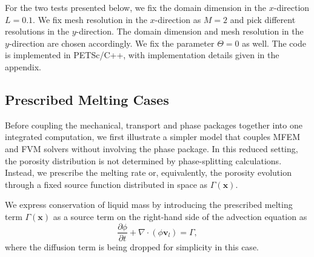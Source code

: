 For the two tests presented below, we fix the domain dimension in the $x$-direction $L = 0.1$.
We fix mesh resolution in the $x$-direction as $M=2$ and pick different resolutions in the $y$-direction.
The domain dimension and mesh resolution in the $y$-direction are chosen accordingly.
We fix the parameter $\Theta = 0$ as well. 
The code is implemented in PETSc/C++, with implementation details given in the appendix.

\subsection{Prescribed Melting Cases}
\label{subsec:prescribed}
Before coupling the mechanical, transport and phase packages together into 
one integrated computation, 
we first illustrate a simpler model that couples MFEM and FVM
solvers without involving the phase package.
In this reduced setting, the porosity distribution is not determined by phase-splitting calculations. 
Instead, we prescribe the melting rate or, equivalently, the porosity evolution through a fixed source function distributed in space as
$\Gamma(\mathbf{x})$.

We express conservation of liquid mass by introducing the prescribed 
melting term $\Gamma(\mathbf{x})$ as a source term on the right-hand
side of the advection equation as
\begin{equation}
		  \frac{\partial \phi}{\partial t} + \nabla \cdot (\phi \mathbf{v}_l) = \Gamma,
\end{equation}
where the diffusion term is being dropped for simplicity in this case.

